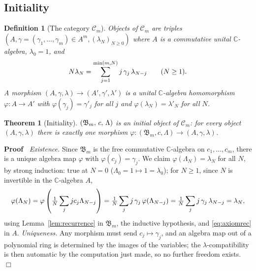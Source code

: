 \documentclass{article}
\newcommand{\tmem}[1]{{\em #1\/}}
\newenvironment{proof}{\noindent\textbf{Proof\ }}{\hspace*{\fill}$\Box$\medskip}
\newtheorem{definition}{Definition}
\newtheorem{theorem}{Theorem}
\newcommand{\CA}{\mathfrak{B}}
\newcommand{\C}{\mathbb{C}}
\begin{document}
\subsection{Initiality}

\begin{definition}
  [The category $\mathcal{C}_m$]\label{def:category} Objects of
  $\mathcal{C}_m$ are triples $(A, \gamma = (\gamma_1, \ldots, \gamma_m) \in
  A^m, (\lambda_N)_{N \ge 0})$ where $A$ is a commutative unital $\C$-algebra,
  $\lambda_0 = 1$, and
  \begin{equation}
    \label{eq:axiomrec} N \lambda_N = \sum_{j = 1}^{\min (m, N)} j
    \hspace{0.17em} \gamma_j  \hspace{0.17em} \lambda_{N - j}  \qquad (N \ge
    1) .
  \end{equation}
  A morphism $(A, \gamma, \lambda) \to (A', \gamma', \lambda')$ is a unital
  $\C$-algebra homomorphism $\varphi : A \to A'$ with $\varphi (\gamma_j) =
  \gamma'_j$ for all $j$ and $\varphi (\lambda_N) = \lambda'_N$ for all $N$.
\end{definition}

\begin{theorem}
  [Initiality]\label{thm:initial} $(\CA_m, \hspace{0.17em} c, \hspace{0.17em}
  \Lambda)$ is an initial object of $\mathcal{C}_m$: for every object $(A,
  \gamma, \lambda)$ there is exactly one morphism $\varphi : (\CA_m, c,
  \Lambda) \to (A, \gamma, \lambda)$.
\end{theorem}

\begin{proof}
  {\tmem{Existence.}} Since $\CA_m$ is the free commutative $\C$-algebra on
  $c_1, \ldots, c_m$, there is a unique algebra map $\varphi$ with $\varphi
  (c_j) = \gamma_j$. We claim $\varphi (\Lambda_N) = \lambda_N$ for all $N$,
  by strong induction: true at $N = 0$ ($\Lambda_0 = 1 \mapsto 1 =
  \lambda_0$); for $N \ge 1$, since $N$ is invertible in the $\C$-algebra $A$,
  \[ \varphi (\Lambda_N) = \varphi \left( \tfrac{1}{N} \sum_j jc_j \Lambda_{N
     - j} \right) = \tfrac{1}{N} \sum_j j \hspace{0.17em} \gamma_j 
     \hspace{0.17em} \varphi (\Lambda_{N - j}) = \tfrac{1}{N} \sum_j j
     \hspace{0.17em} \gamma_j  \hspace{0.17em} \lambda_{N - j} = \lambda_N, \]
  using Lemma~\ref{lem:recurrence} in $\CA_m$, the inductive hypothesis, and
  \eqref{eq:axiomrec} in $A$. {\tmem{Uniqueness.}} Any morphism must send $c_j
  \mapsto \gamma_j$, and an algebra map out of a polynomial ring is determined
  by the images of the variables; the $\lambda$-compatibility is then
  automatic by the computation just made, so no further freedom exists.
\end{proof}
\end{document}
